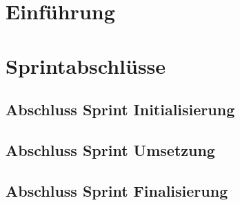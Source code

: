 

\chapter{Einführung}

\chapter{Sprintabschlüsse}

\section{Abschluss Sprint Initialisierung}

\section{Abschluss Sprint Umsetzung}

\section{Abschluss Sprint Finalisierung}


